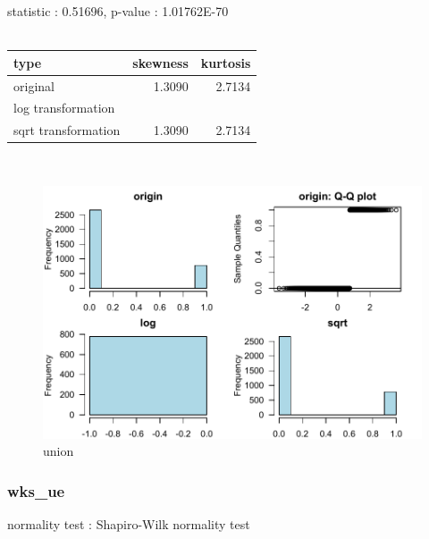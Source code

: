 \documentclass{book}\usepackage[]{graphicx}\usepackage[]{color}
\begin{document}
\noindent statistic : 0.51696,  p-value : 1.01762E-70\\
\\%
\begin{tabular}{lrr}
  \toprule
type & skewness & kurtosis \\ 
  \midrule
original & 1.3090 & 2.7134 \\ 
  log transformation &  &  \\ 
  sqrt transformation & 1.3090 & 2.7134 \\ 
   \bottomrule
\end{tabular}
\\
\begin{figure}[!ht]
\centering
\includegraphics[width=1.0\textwidth]{figure/norm15.pdf}
\caption{union}
\end{figure}
\clearpage
\subsubsection{ wks\_ue }

normality test : Shapiro-Wilk normality test
\end{document}
